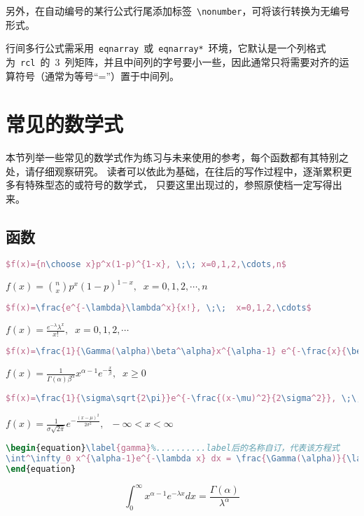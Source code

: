 另外，在自动编号的某行公式行尾添加标签~\verb|\nonumber|，可将该行转换为无编号形式。

行间多行公式需采用~\verb|eqnarray|~或~\verb|eqnarray*|~环境，它默认是一个列格式为~\verb|rcl|~的~3~列矩阵，并且中间列的字号要小一些，因此通常只将需要对齐的运算符号（通常为等号“=”）置于中间列。

\section{常见的数学式}
本节列举一些常见的数学式作为练习与未来使用的参考，每个函数都有其特别之处，请仔细观察研究。
读者可以依此为基础，在往后的写作过程中，逐渐累积更多有特殊型态的或符号的数学式，
只要这里出现过的，参照原使档一定写得出来。

\subsection{函数}
\begin{lstlisting}[language=TeX,numbers=none,frame=lrtb,keywords={begin},label=Binomial,caption=Binomial] 
$f(x)={n\choose x}p^x(1-p)^{1-x}, \;\; x=0,1,2,\cdots,n$ 
\end{lstlisting}
$f(x)={n\choose x}p^x(1-p)^{1-x}, \;\; x=0,1,2,\cdots,n$ 
   
\begin{lstlisting}[language=TeX,numbers=none,frame=lrtb,keywords={begin},label=Poisson,caption=Poisson] 
$f(x)=\frac{e^{-\lambda}\lambda^x}{x!}, \;\;  x=0,1,2,\cdots$ 
\end{lstlisting}
$f(x)=\frac{e^{-\lambda}\lambda^x}{x!}, \;\;  x=0,1,2,\cdots$
  
\begin{lstlisting}[language=TeX,numbers=none,frame=lrtb,keywords={begin},label=Gamma,caption=Gamma] 
$f(x)=\frac{1}{\Gamma(\alpha)\beta^\alpha}x^{\alpha-1} e^{-\frac{x}{\beta}}, \;\; x\geq 0$
\end{lstlisting}
$f(x)=\frac{1}{\Gamma(\alpha)\beta^\alpha}x^{\alpha-1}e^{-\frac{x}{\beta}}, \;\; x\geq 0$ 
  
\begin{lstlisting}[language=TeX,numbers=none,frame=lrtb,keywords={begin},label=Normal,caption=Normal] 
$f(x)=\frac{1}{\sigma\sqrt{2\pi}}e^{-\frac{(x-\mu)^2}{2\sigma^2}}, \;\;  -\infty < x < \infty $
\end{lstlisting}
$f(x)=\frac{1}{\sigma\sqrt{2\pi}}e^{-\frac{(x-\mu)^2}{2\sigma^2}}, \;\;  -\infty < x < \infty $
  
\begin{lstlisting}[language=TeX,numbers=none,frame=lrtb,keywords={begin},label=Int,caption=积分式与方程式编号] 
\begin{equation}\label{gamma}%..........label后的名称自订，代表该方程式
\int^\infty_0 x^{\alpha-1}e^{-\lambda x} dx = \frac{\Gamma(\alpha)}{\lambda^{\alpha}}
\end{equation}
\end{lstlisting}
\begin{equation}\label{gamma}%
\int^\infty_0 x^{\alpha-1}e^{-\lambda x} dx = \frac{\Gamma(\alpha)}{\lambda^{\alpha}}
\end{equation}
  
